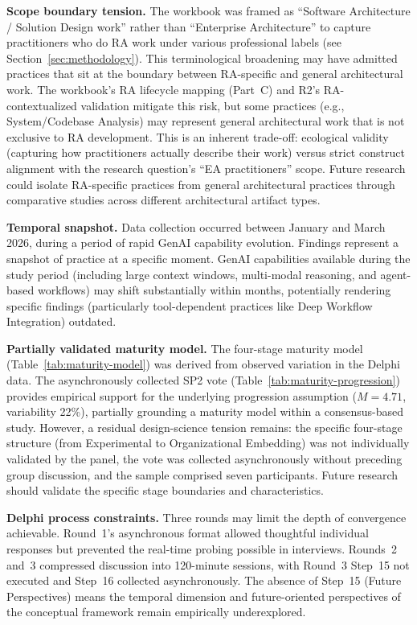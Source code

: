 \textbf{Scope boundary tension.} The workbook was framed as ``Software
Architecture / Solution Design work'' rather than ``Enterprise Architecture'' to
capture practitioners who do RA work under various professional labels (see
Section~\ref{sec:methodology}). This terminological broadening may have
admitted practices that sit at the boundary between RA-specific and general
architectural work. The workbook's RA lifecycle mapping (Part~C) and R2's
RA-contextualized validation mitigate this risk, but some practices (e.g.,
System/Codebase Analysis) may represent general architectural work that is not
exclusive to RA development. This is an inherent trade-off: ecological validity
(capturing how practitioners actually describe their work) versus strict
construct alignment with the research question's ``EA practitioners'' scope.
Future research could isolate RA-specific practices from general architectural
practices through comparative studies across different architectural artifact
types.

\textbf{Temporal snapshot.} Data collection occurred between January and March
2026, during a period of rapid GenAI capability evolution. Findings represent
a snapshot of practice at a specific moment. GenAI capabilities available
during the study period (including large context windows, multi-modal
reasoning, and agent-based workflows) may shift substantially within months,
potentially rendering specific findings (particularly tool-dependent practices
like Deep Workflow Integration) outdated.

\textbf{Partially validated maturity model.} The four-stage maturity model
(Table~\ref{tab:maturity-model}) was derived from observed variation in the
Delphi data. The asynchronously collected SP2 vote
(Table~\ref{tab:maturity-progression}) provides empirical support for the underlying progression assumption
($M = 4.71$, variability 22\%), partially grounding a maturity model within a
consensus-based study. However, a residual design-science tension remains: the specific
four-stage structure (from Experimental to Organizational Embedding) was not
individually validated by the panel, the vote was collected asynchronously
without preceding group discussion, and the sample comprised seven participants.
Future research should validate the specific stage boundaries and
characteristics.

\textbf{Delphi process constraints.} Three rounds may limit the depth of
convergence achievable. Round~1's asynchronous format allowed thoughtful
individual responses but prevented the real-time probing possible in
interviews. Rounds~2 and~3 compressed discussion into 120-minute sessions,
with Round~3 Step~15 not executed and Step~16 collected asynchronously. The
absence of Step~15 (Future Perspectives) means the temporal dimension and
future-oriented perspectives of the conceptual framework remain empirically
underexplored.

